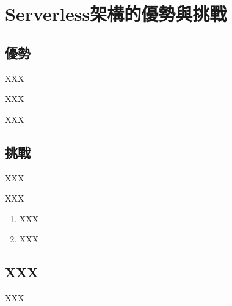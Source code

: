 \chapter{Serverless架構的優勢與挑戰}
\renewcommand{\baselinestretch}{10} %
\section{優勢}
\par
\renewcommand{\baselinestretch}{1} %
\twelve XXX\\
\par
\renewcommand{\baselinestretch}{1} %
\twelve XXX\\
\par
\renewcommand{\baselinestretch}{1} %
\twelve XXX
\par

\renewcommand{\baselinestretch}{20} %
\section{挑戰}
\par
\renewcommand{\baselinestretch}{1} %
\twelve XXX\\
\par
\renewcommand{\baselinestretch}{1} %
\twelve XXX
\begin{enumerate}
	\item XXX
	\item XXX
\end{enumerate}
\par

\renewcommand{\baselinestretch}{20} %
\section{XXX}
\par
\renewcommand{\baselinestretch}{1} %
\twelve XXX
\par
